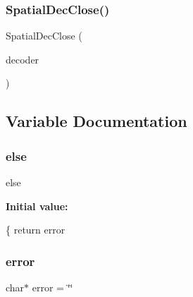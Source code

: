 \subsubsection{Spatial\+Dec\+Close()}
{\footnotesize\ttfamily Spatial\+Dec\+Close (\begin{DoxyParamCaption}\item[{decoder}]{ }\end{DoxyParamCaption})}



\subsection{Variable Documentation}
\mbox{\label{sac__decoder_8c_a0544c3fe466e421738dae463968b70ba}} 
\subsubsection{else}
{\footnotesize\ttfamily else}

{\bfseries Initial value\+:}
\begin{DoxyCode}
\{
        \textcolor{keywordflow}{return} error
\end{DoxyCode}
\mbox{\label{sac__decoder_8c_a37a27b523e8aff433c8a4adda2295f0d}} 
\subsubsection{error}
{\footnotesize\ttfamily char$\ast$ error = \char`\"{}\char`\"{}}

